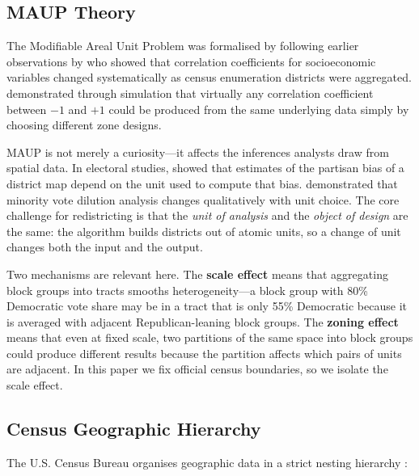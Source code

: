 \subsection{MAUP Theory}

The Modifiable Areal Unit Problem was formalised by \citet{openshaw1984modifiable}
following earlier observations by \citet{gehlke1934certain} who showed that
correlation coefficients for socioeconomic variables changed systematically
as census enumeration districts were aggregated.  \citet{openshaw1983modifiable}
demonstrated through simulation that virtually any correlation coefficient
between $-1$ and $+1$ could be produced from the same underlying data simply
by choosing different zone designs.

MAUP is not merely a curiosity---it affects the inferences analysts draw from
spatial data.  In electoral studies, \citet{curtice1988measuring} showed that
estimates of the partisan bias of a district map depend on the unit used to
compute that bias.  \citet{altman1998scaling} demonstrated that minority vote
dilution analysis changes qualitatively with unit choice.  The core challenge
for redistricting is that the \emph{unit of analysis} and the \emph{object
of design} are the same: the algorithm builds districts out of atomic units,
so a change of unit changes both the input and the output.

Two mechanisms are relevant here.  The \textbf{scale effect} means that
aggregating block groups into tracts smooths heterogeneity---a block group
with 80\% Democratic vote share may be in a tract that is only 55\%
Democratic because it is averaged with adjacent Republican-leaning block
groups.  The \textbf{zoning effect} means that even at fixed scale, two
partitions of the same space into block groups could produce different results
because the partition affects which pairs of units are adjacent.  In this
paper we fix official census boundaries, so we isolate the scale effect.

\subsection{Census Geographic Hierarchy}

The U.S. Census Bureau organises geographic data in a strict nesting
hierarchy \citep{census_geographic_overview}:

